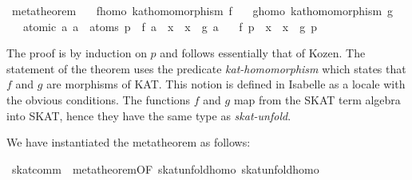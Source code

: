 \documentclass{llncs}
\begin{document}
\begin{isabellebody}
\isanewline
{}\isamarkupfalse%
\ metatheorem{}\isanewline
\ \ \ f{}homo{}\ {}kat{}homomorphism\ f{}\isanewline
\ \ \ g{}homo{}\ {}kat{}homomorphism\ g{}\isanewline
\ \ \ atomic{}\ {}{}a{}\ a\ {}\ atoms\ p\ {}\ f\ a\ {}\ x\ {}\ x\ {}\ g\ a{}\isanewline
\ \ \ {}f\ p\ {}\ x\ {}\ x\ {}\ g\ p{}\isanewline
\end{isabellebody}

The proof is by induction on $p$ and follows essentially that of
Kozen. The statement of the theorem uses the predicate
\textit{kat-homomorphism} which states that $f$ and $g$ are morphisms
of KAT. This notion is defined in Isabelle as a locale with the
obvious conditions. The functions $f$ and $g$ map from the SKAT term
algebra into SKAT, hence they have the same type as
\textit{skat-unfold}.

We have instantiated the metatheorem as follows:

\begin{isabellebody}
\isanewline
{}\isamarkupfalse%
\ skat{}comm\ {}\ metatheorem{}OF\ skat{}unfold{}homo\ skat{}unfold{}homo{}\isanewline
\end{isabellebody}
\end{document}

